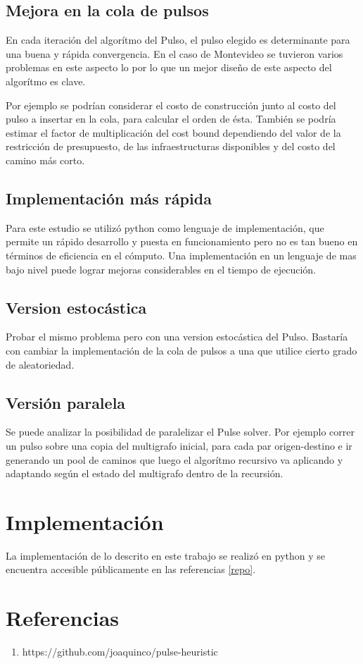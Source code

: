 \documentclass{article}
\begin{document}
  \subsection*{Mejora en la cola de pulsos}

  En cada iteración del algorítmo del Pulso, el pulso elegido es determinante para una buena y rápida convergencia. En el caso de Montevideo se tuvieron varios problemas en este aspecto lo por lo que un mejor diseño de este aspecto del algorítmo es clave.
  
  Por ejemplo se podrían considerar el costo de construcción junto al costo del pulso a insertar en la cola, para calcular el orden de ésta. También se podría estimar el factor de multiplicación del cost bound dependiendo del valor de la restricción de presupuesto, de las infraestructuras disponibles y del costo del camino más corto.

  \subsection*{Implementación más rápida}

  Para este estudio se utilizó python como lenguaje de implementación, que permite un rápido desarrollo y puesta en funcionamiento pero no es tan bueno en términos de eficiencia en el cómputo. Una implementación en un lenguaje de mas bajo nivel puede lograr mejoras considerables en el tiempo de ejecución.

  \subsection*{Version estocástica}

  Probar el mismo problema pero con una version estocástica del Pulso. Bastaría con cambiar la implementación de la cola de pulsos a una que utilice cierto grado de aleatoriedad.

  \subsection*{Versión paralela}

  Se puede analizar la posibilidad de paralelizar el Pulse solver. Por ejemplo correr un pulso sobre una copia del multigrafo inicial, para cada par origen-destino e ir generando un pool de caminos que luego el algorítmo recursivo va aplicando y adaptando según el estado del multigrafo dentro de la recursión.

  \section*{Implementación}

  La implementación de lo descrito en este trabajo se realizó en python y se encuentra accesible públicamente en las referencias \ref{repo}.

  \section*{Referencias}

  \begin{enumerate}
    \item \label{repo} https://github.com/joaquinco/pulse-heuristic
  \end{enumerate}
\end{document}
